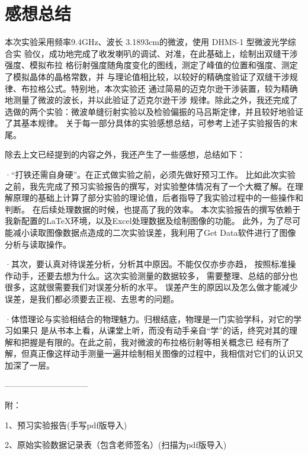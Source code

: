 \documentclass[11pt]{article}
\begin{document}
\section{感想总结}


本次实验采用频率9.4GHz、波长 3.1893cm的微波，使用 DHMS-1 型微波光学综合实
验仪，成功地完成了收发喇叭的调试、对准，在此基础上，绘制出双缝干涉强度、模拟布拉
格衍射强度随角度变化的图线，测定了峰值的位置和强度、测定了模拟晶体的晶格常数，并
与理论值相比较，以较好的精确度验证了双缝干涉规律、布拉格公式。特别地，本次实验还
通过简易的迈克尔逊干涉装置，较为精确地测量了微波的波长，并以此验证了迈克尔逊干涉
规律。除此之外，我还完成了选做的两个实验：微波单缝衍射实验以及检验偏振的马吕斯定律，并且较好地验证了其基本规律。
关于每一部分具体的实验感想总结，可参考上述子实验报告的末尾。

除去上文已经提到的内容之外，我还产生了一些感想，总结如下：

·“打铁还需自身硬”。在正式做实验之前，必须先做好预习工作。
比如此次实验之前，我先完成了预习实验报告的撰写，对实验整体情况有了一个大概了解。在理解原理的基础上计算了部分实验的理论值，后者指导了我实验过程中的一些操作和判断。
在后续处理数据的时候，也提高了我的效率。
本次实验报告的撰写依赖于我新配置的\LaTeX 环境，以及Excel处理数据及绘制图像的功能。
此外，为了尽可能减小读取图像数据点造成的二次实验误差，我利用了Get Data软件进行了图像分析与读取操作。


·其次，要认真对待误差分析，分析其中原因。不能仅仅亦步亦趋，
按照标准操作动手，还要去想为什么。这次实验测量的数据较多，
需要整理、总结的部分也很多，这就很需要我们对误差分析的水平。
误差产生的原因以及怎么做才能减少误差，是我们都必须要去正视、去思考的问题。

·体悟理论与实验相结合的物理魅力。归根结底，物理是一门实验学科，对它的学习如果只
是从书本上看，从课堂上听，而没有动手亲自“学”的话，终究对其的理解和把握是有限的。在此之前，我对微波的布拉格衍射等相关概念已
经有所了解，但真正像这样动手测量一遍并绘制相关图像的过程中，我相信对它们的认识又加深了一层。


\bigskip
——————————

附：

1、预习实验报告(手写pdf版导入)

2、原始实验数据记录表（包含老师签名）(扫描为pdf版导入)

\newpage



\end{document}
